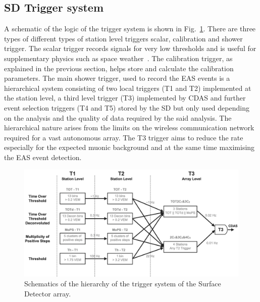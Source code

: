 \subsection{SD Trigger system}
\label{sec:Sur_det_trig}
A schematic of the logic of the trigger system is shown in Fig.~\ref{fig:SD_trigger_logic}. There are three types of different types of station level triggers scalar, calibration and shower trigger. The scalar trigger records signals for very low thresholds and is useful for supplementary physics such as space weather~\cite{Dasso:2012vk}. The calibration trigger, as explained in the previous section, helps store and calculate the calibration parameters. The main shower trigger, used to record the EAS events is a hierarchical system consisting of two local triggers (T1 and T2) implemented at the station level, a third level trigger (T3) implemented by CDAS and further event selection triggers (T4 and T5) stored by the SD but only used depending on the analysis and the quality of data required by the said analysis. The hierarchical nature arises from the limits on the wireless communication network required for a vast autonomous array. The T3 trigger aims to reduce the rate especially for the expected muonic background and at the same time maximising the EAS event detection.  

\begin{figure}[h!]
  \centering
  \includegraphics[width=\textwidth]{thesis_figures/Setup/Trigger_logic.png}
  \caption{Schematics of the hierarchy of the trigger system of the Surface Detector array.}
  \label{fig:SD_trigger_logic}
\end{figure}

